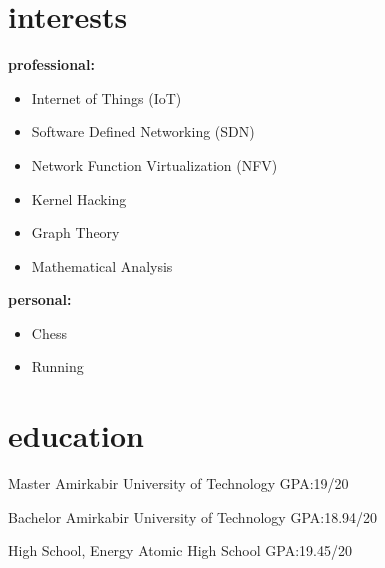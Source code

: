 \documentclass[]{friggeri-cv} %
\begin{document}

\section{interests}
\textbf{professional:}
\begin{itemize}
	\item Internet of Things (IoT)
	\item Software Defined Networking (SDN)
	\item Network Function Virtualization (NFV)
	\item Kernel Hacking
	\item Graph Theory
	\item Mathematical Analysis
\end{itemize}
\textbf{personal:}
\begin{itemize}	
	\item Chess
	\item Running
\end{itemize}



\section{education}

\begin{entrylist}


	{Master }
	{Amirkabir University of Technology}
	{GPA:\@ 19/20}


	{Bachelor }
	{Amirkabir University of Technology}
	{GPA:\@ 18.94/20}


	{High School, }
	{Energy Atomic High School}
	{GPA:\@ 19.45/20}



\end{entrylist}
\pagebreak
\end{document}
